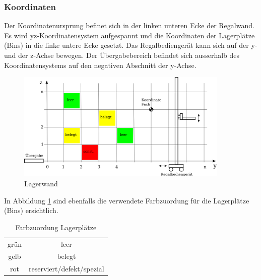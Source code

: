 \subsubsection{Koordinaten}
Der Koordinatenursprung befinet sich in der linken unteren Ecke der Regalwand. Es wird yz-Koordinatensystem aufgespannt und die Koordinaten der Lagerplätze (Bins) in die linke untere Ecke gesetzt. Das Regalbediengerät kann sich auf der y- und der z-Achse bewegen. Der Übergabebereich befindet sich ausserhalb des Koordinatensystems auf den negativen Abschnitt der y-Achse. 
%
\begin{figure}[h]
  \begin{center}
    \includegraphics[width=0.9\textwidth]{images/koordinaten-wand.png}
    \caption{Lagerwand}
    \label{fig:wand}
  \end{center}
\end{figure}
%
In Abbildung \ref{fig:wand} sind ebenfalls die verwendete Farbzuordung für die Lagerplätze (Bins) ersichtlich.
%
\begin{table}
  \caption{Farbzuordung Lagerplätze}
  \label{tab:bin-color}

  \begin{center}
    \begin{tabular}{cc}
       grün & leer\\
       gelb & belegt\\
       rot & reserviert/defekt/spezial \\
    \end{tabular}
  \end{center}
\end{table}

%
